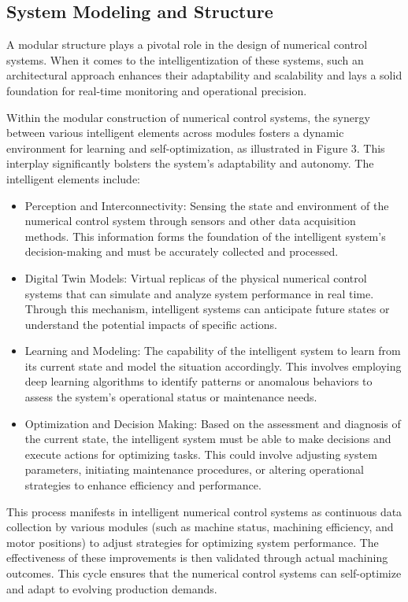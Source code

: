 \documentclass[preprint,12pt,authoryear]{elsarticle}
\begin{document}
\subsection{System Modeling and Structure}
A modular structure plays a pivotal role in the design of numerical control systems. When it comes to the intelligentization of these systems, such an architectural approach enhances their adaptability and scalability and lays a solid foundation for real-time monitoring and operational precision.


Within the modular construction of numerical control systems, the synergy between various intelligent elements across modules fosters a dynamic environment for learning and self-optimization, as illustrated in Figure 3. This interplay significantly bolsters the system's adaptability and autonomy. The intelligent elements include:

\begin{itemize}
    \item Perception and Interconnectivity: Sensing the state and environment of the numerical control system through sensors and other data acquisition methods. This information forms the foundation of the intelligent system's decision-making and must be accurately collected and processed.

    \item Digital Twin Models: Virtual replicas of the physical numerical control systems that can simulate and analyze system performance in real time. Through this mechanism, intelligent systems can anticipate future states or understand the potential impacts of specific actions.

    \item Learning and Modeling: The capability of the intelligent system to learn from its current state and model the situation accordingly. This involves employing deep learning algorithms to identify patterns or anomalous behaviors to assess the system's operational status or maintenance needs.

    \item Optimization and Decision Making: Based on the assessment and diagnosis of the current state, the intelligent system must be able to make decisions and execute actions for optimizing tasks. This could involve adjusting system parameters, initiating maintenance procedures, or altering operational strategies to enhance efficiency and performance.
\end{itemize}

This process manifests in intelligent numerical control systems as continuous data collection by various modules (such as machine status, machining efficiency, and motor positions) to adjust strategies for optimizing system performance. The effectiveness of these improvements is then validated through actual machining outcomes. This cycle ensures that the numerical control systems can self-optimize and adapt to evolving production demands.
\end{document}
